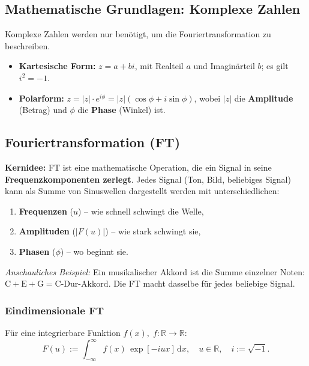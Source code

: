 \documentclass[12pt, a4paper]{article}
\begin{document}
\subsection{Mathematische Grundlagen: Komplexe Zahlen}

Komplexe Zahlen werden nur benötigt, um die Fouriertransformation zu
beschreiben.

\begin{itemize}
  \item \textbf{Kartesische Form:} $z = a + bi$, mit Realteil $a$ und
        Imaginärteil $b$; es gilt $i^2 = -1$.
  \item \textbf{Polarform:} $z = |z| \cdot e^{i\phi} = |z|(\cos\phi + i\sin\phi)$,
        wobei $|z|$ die \textbf{Amplitude} (Betrag) und $\phi$ die
        \textbf{Phase} (Winkel) ist.
\end{itemize}

\subsection{Fouriertransformation (FT)}

\textbf{Kernidee:} FT ist eine mathematische Operation, die ein Signal in
seine \textbf{Frequenzkomponenten zerlegt}. Jedes Signal (Ton, Bild,
beliebiges Signal) kann als Summe von Sinuswellen dargestellt werden
mit unterschiedlichen:
\begin{enumerate}
  \item \textbf{Frequenzen} ($u$) -- wie schnell schwingt die Welle,
  \item \textbf{Amplituden} ($|F(u)|$) -- wie stark schwingt sie,
  \item \textbf{Phasen} ($\phi$) -- wo beginnt sie.
\end{enumerate}

\textit{Anschauliches Beispiel:} Ein musikalischer Akkord ist die Summe
einzelner Noten: $\mathrm{C} + \mathrm{E} + \mathrm{G} =
\mathrm{C\text{-}Dur\text{-}Akkord}$. Die FT macht dasselbe für jedes
beliebige Signal.

\subsubsection{Eindimensionale FT}

Für eine integrierbare Funktion $f(x),\; f:\mathbb{R}\to\mathbb{R}$:
\[
  F(u) := \int_{-\infty}^{\infty} f(x)\,\exp[-iux]\,\mathrm{d}x,
  \quad u \in \mathbb{R},\quad i := \sqrt{-1}.
\]
\end{document}
